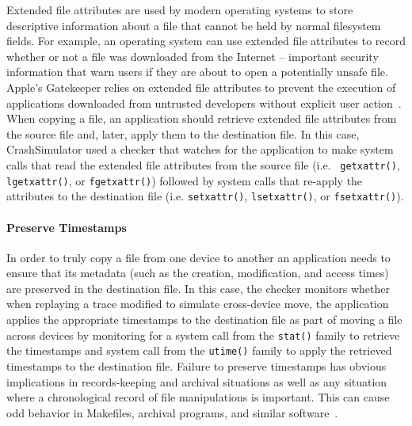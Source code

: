 Extended file attributes are used by modern
operating systems to store descriptive information about a file that cannot be
held by normal filesystem fields.  For example, an operating system can use
extended file attributes to record whether or not a file was downloaded from the
Internet -- important security information that warn
users if they are about to open a potentially unsafe file.  Apple's Gatekeeper
relies on extended file attributes to prevent the execution of applications downloaded from
untrusted developers without explicit user action~\cite{AppleCodeSigning}.
When copying a file,
an application should retrieve extended file attributes from the source
file and, later, apply them to the destination file.
In this case, CrashSimulator used a checker
that watches for the application to make system calls
that read the extended file attributes from the source file (i.e. {\tt
  getxattr()}, {\tt lgetxattr()}, or {\tt fgetxattr()}) followed by system calls
that re-apply the attributes to the destination file (i.e. {\tt setxattr()},
{\tt lsetxattr()}, or {\tt fsetxattr()}).

\paragraph{Preserve Timestamps}

In order to truly copy a file from one device
to another an application needs to ensure that its metadata (such as the 
creation, modification, and access times) are preserved in the destination 
file.  
In this case, the checker monitors
whether when replaying a trace modified to simulate cross-device move,
the application applies
the appropriate timestamps to the destination file as part of moving a file
across devices by monitoring for a system call from the {\tt stat()} family to
retrieve the timestamps and system call from the {\tt utime()} family to apply
the retrieved timestamps to the destination file.
Failure to preserve timestamps has obvious
implications in records-keeping and archival situations as well as any situation
where a chronological record of file manipulations is important.  This can 
cause odd behavior in Makefiles, archival programs, and similar
software~\cite{NautilusTimestamps, SudoTimestamp}.

